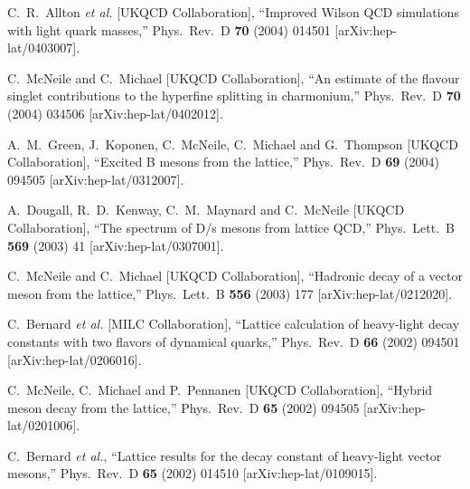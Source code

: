 \begin{thebibliography}{130}
C.~R.~Allton {\it et al.}  [UKQCD Collaboration],
``Improved Wilson QCD simulations with light quark masses,''
Phys.\ Rev.\ D {\bf 70} (2004) 014501
[arXiv:hep-lat/0403007].

C.~McNeile and C.~Michael  [UKQCD Collaboration],
``An estimate of the flavour singlet contributions to the hyperfine
splitting
in charmonium,''
Phys.\ Rev.\ D {\bf 70} (2004) 034506
[arXiv:hep-lat/0402012].



A.~M.~Green, J.~Koponen, C.~McNeile, C.~Michael and G.~Thompson
[UKQCD
                  Collaboration],
``Excited B mesons from the lattice,''
Phys.\ Rev.\ D {\bf 69} (2004) 094505
[arXiv:hep-lat/0312007].


A.~Dougall, R.~D.~Kenway, C.~M.~Maynard and C.~McNeile  [UKQCD
                  Collaboration],
``The spectrum of D/s mesons from lattice QCD,''
Phys.\ Lett.\ B {\bf 569} (2003) 41
[arXiv:hep-lat/0307001].


C.~McNeile and C.~Michael  [UKQCD Collaboration],
``Hadronic decay of a vector meson from the lattice,''
Phys.\ Lett.\ B {\bf 556} (2003) 177
[arXiv:hep-lat/0212020].


C.~Bernard {\it et al.}  [MILC Collaboration],
``Lattice calculation of heavy-light decay constants with two flavors
of  dynamical quarks,''
Phys.\ Rev.\ D {\bf 66} (2002) 094501
[arXiv:hep-lat/0206016].



C.~McNeile, C.~Michael and P.~Pennanen  [UKQCD Collaboration],
``Hybrid meson decay from the lattice,''
Phys.\ Rev.\ D {\bf 65} (2002) 094505
[arXiv:hep-lat/0201006].


C.~Bernard {\it et al.},
``Lattice results for the decay constant of heavy-light vector
mesons,''
Phys.\ Rev.\ D {\bf 65} (2002) 014510
[arXiv:hep-lat/0109015].



\end{thebibliography}
